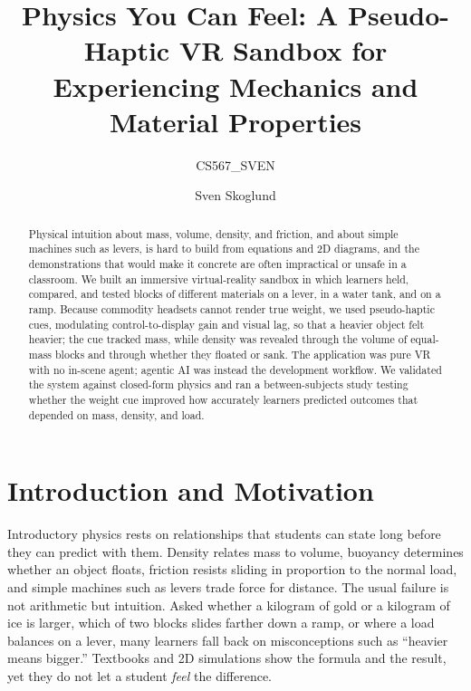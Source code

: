 \documentclass[sigconf,nonacm]{acmart}
\begin{document}
\title{Physics You Can Feel: A Pseudo-Haptic VR Sandbox for Experiencing Mechanics and Material Properties}
\subtitle{CS567\_SVEN}

\author{Sven Skoglund}

\renewcommand{\shortauthors}{CS567\_SVEN}

\begin{abstract}
Physical intuition about mass, volume, density, and friction, and about simple
machines such as levers, is hard to build from equations and 2D diagrams, and the
demonstrations that would make it concrete are often impractical or unsafe in a
classroom. We built an immersive virtual-reality sandbox in which learners held,
compared, and tested blocks of different materials on a lever, in a water tank, and
on a ramp. Because commodity headsets cannot render true weight, we used pseudo-haptic
cues, modulating control-to-display gain and visual lag, so that a heavier object felt
heavier; the cue tracked mass, while density was revealed through the volume of
equal-mass blocks and through whether they floated or sank. The application was pure
VR with no in-scene agent; agentic AI was instead the development workflow. We
validated the system against closed-form physics and ran a between-subjects study
testing whether the weight cue improved how accurately learners predicted outcomes
that depended on mass, density, and load.
\end{abstract}


\maketitle

\section{Introduction and Motivation}
Introductory physics rests on relationships that students can state long before they
can predict with them. Density relates mass to volume, buoyancy determines whether an
object floats, friction resists sliding in proportion to the normal load, and simple
machines such as levers trade force for distance. The usual failure is not arithmetic
but intuition. Asked whether a kilogram of gold or a kilogram of ice is larger, which
of two blocks slides farther down a ramp, or where a load balances on a lever, many
learners fall back on misconceptions such as ``heavier means bigger.'' Textbooks and
2D simulations show the formula and the result, yet they do not let a student
\emph{feel} the difference.
\end{document}
